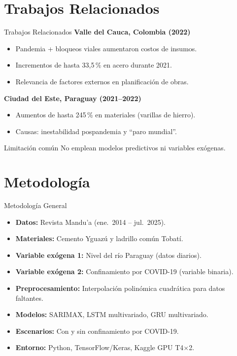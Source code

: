 \documentclass[12pt, aspectratio=169]{beamer}
\begin{document}
\section{Trabajos Relacionados}

\begin{frame}{Trabajos Relacionados}
\textbf{Valle del Cauca, Colombia (2022)}
\begin{itemize}
  \item Pandemia + bloqueos viales aumentaron costos de insumos.
  \item Incrementos de hasta 33,5\,\% en acero durante 2021.
  \item Relevancia de factores externos en planificaci\'on de obras.
\end{itemize}

\vspace{0.3cm}
\textbf{Ciudad del Este, Paraguay (2021--2022)}
\begin{itemize}
  \item Aumentos de hasta 245\,\% en materiales (varillas de hierro).
  \item Causas: inestabilidad pospandemia y ``paro mundial''.
\end{itemize}

\vspace{0.3cm}
\begin{alertblock}{Limitaci\'on com\'un}
No emplean modelos predictivos ni variables ex\'ogenas.
\end{alertblock}
\end{frame}

\section{Metodolog\'ia}

\begin{frame}{Metodolog\'ia General}
\begin{itemize}
  \item \textbf{Datos:} Revista Mandu'a (ene.\ 2014 -- jul.\ 2025).
  \item \textbf{Materiales:} Cemento Ygua\-z\'u y ladrillo com\'un Tobat\'i.
  \item \textbf{Variable ex\'ogena 1:} Nivel del r\'io Paraguay (datos diarios).
  \item \textbf{Variable ex\'ogena 2:} Confinamiento por COVID-19 (variable binaria).
  \item \textbf{Preprocesamiento:} Interpolaci\'on polin\'omica cuadr\'atica para datos faltantes.
  \item \textbf{Modelos:} SARIMAX, LSTM multivariado, GRU multivariado.
  \item \textbf{Escenarios:} Con y sin confinamiento por COVID-19.
  \item \textbf{Entorno:} Python, TensorFlow/Keras, Kaggle GPU T4$\times$2.
\end{itemize}
\end{frame}
\end{document}
